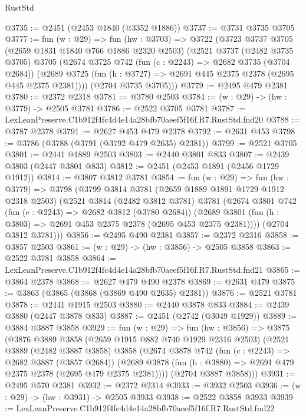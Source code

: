 \begin{lexlean}{RustStd}
\begin{coremodule}
@3735 := @2451 (@2453 @1840 (@3352 @1886))
@3737 := @3731 @3735 @3705
@3777 := fun (w : @29) =>
  fun (hw : @3703) =>
  @3722
    (@3723
      @3737
      @3705
      (@2659 @1831 @1840 @766 @1886 @2320 @2503)
      (@2521
        @3737
        (@2482 @3735 @3705)
        @3705
        (@2674
          @3725
          @742
          (fun (c : @2243) => @2682 @3735 (@3704 @2684))
          (@2689 @3725 (fun (h : @3727) => @2691 @445 @2375 @2378 (@2695 @445 @2375 @2381))))
        (@2704 @3735 @3705)))
@3779 := @2495 @479 @2381
@3780 := @2372 @2318
@3781 := @3780 @2503
@3784 := (w : @29) -> (hw : @3779) -> @2505 @3781
@3786 := @2522 @3705 @3781
@3787 := LexLeanPreserve.C1b912f4fc4d4e14a28bfb70aeef5f16f.R7.RustStd.fnd20
@3788 := @3787 @2378
@3791 := @2627 @453 @479 @2378
@3792 := @2631 @453
@3798 := @3786 (@3788 (@3791 (@3792 @479 @2635) @2381))
@3799 := @2521 @3705
@3801 := @2441 @1889 @2503
@3803 := @2440 @3801 @833
@3807 := @2439 @3803 (@2447 @3801 @833)
@3812 := @2451 (@2453 @1891 (@2456 @1729 @1912))
@3814 := @3807 @3812 @3781
@3854 := fun (w : @29) =>
  fun (hw : @3779) =>
  @3798
    (@3799
      @3814
      @3781
      (@2659 @1889 @1891 @1729 @1912 @2318 @2503)
      (@2521
        @3814
        (@2482 @3812 @3781)
        @3781
        (@2674
          @3801
          @742
          (fun (c : @2243) => @2682 @3812 (@3780 @2684))
          (@2689 @3801 (fun (h : @3803) => @2691 @453 @2375 @2378 (@2695 @453 @2375 @2381))))
        (@2704 @3812 @3781)))
@3856 := @2495 @490 @2381
@3857 := @2372 @2316
@3858 := @3857 @2503
@3861 := (w : @29) -> (hw : @3856) -> @2505 @3858
@3863 := @2522 @3781 @3858
@3864 := LexLeanPreserve.C1b912f4fc4d4e14a28bfb70aeef5f16f.R7.RustStd.fnd21
@3865 := @3864 @2378
@3868 := @2627 @479 @490 @2378
@3869 := @2631 @479
@3875 := @3863 (@3865 (@3868 (@3869 @490 @2635) @2381))
@3876 := @2521 @3781
@3878 := @2441 @1915 @2503
@3880 := @2440 @3878 @833
@3884 := @2439 @3880 (@2447 @3878 @833)
@3887 := @2451 (@2742 (@3049 @1929))
@3889 := @3884 @3887 @3858
@3929 := fun (w : @29) =>
  fun (hw : @3856) =>
  @3875
    (@3876
      @3889
      @3858
      (@2659 @1915 @882 @740 @1929 @2316 @2503)
      (@2521
        @3889
        (@2482 @3887 @3858)
        @3858
        (@2674
          @3878
          @742
          (fun (c : @2243) => @2682 @3887 (@3857 @2684))
          (@2689 @3878 (fun (h : @3880) => @2691 @479 @2375 @2378 (@2695 @479 @2375 @2381))))
        (@2704 @3887 @3858)))
@3931 := @2495 @570 @2381
@3932 := @2372 @2314
@3933 := @3932 @2503
@3936 := (w : @29) -> (hw : @3931) -> @2505 @3933
@3938 := @2522 @3858 @3933
@3939 := LexLeanPreserve.C1b912f4fc4d4e14a28bfb70aeef5f16f.R7.RustStd.fnd22

\end{coremodule}
\end{lexlean}
